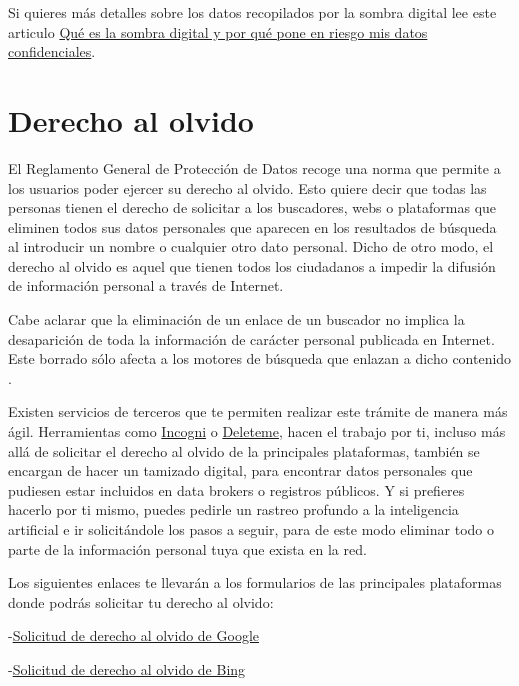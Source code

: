 \documentclass[
  spanish,
  a4paper,
  openany]{book}
\begin{document}
Si quieres más detalles sobre los datos recopilados por la sombra digital lee este articulo \href{https://www.infobae.com/tecno/2024/03/30/que-es-la-sombra-digital-y-por-que-pone-en-riesgo-mis-datos-confidenciales/}{Qué es la sombra digital y por qué pone en riesgo mis datos confidenciales}.

\section{Derecho al olvido}\label{derecho-al-olvido}

El Reglamento General de Protección de Datos recoge una norma que permite a los usuarios poder ejercer su derecho al olvido. Esto quiere decir que todas las personas tienen el derecho de solicitar a los buscadores, webs o plataformas que eliminen todos sus datos personales que aparecen en los resultados de búsqueda al introducir un nombre o cualquier otro dato personal. Dicho de otro modo, el derecho al olvido es aquel que tienen todos los ciudadanos a impedir la difusión de información personal a través de Internet.

Cabe aclarar que la eliminación de un enlace de un buscador no implica la desaparición de toda la información de carácter personal publicada en Internet. Este borrado sólo afecta a los motores de búsqueda que enlazan a dicho contenido \citep{OSI-derecho-al-olvido}.

Existen servicios de terceros que te permiten realizar este trámite de manera más ágil. Herramientas como \href{https://incogni.com/}{Incogni} o \href{https://joindeleteme.com/}{Deleteme}, hacen el trabajo por ti, incluso más allá de solicitar el derecho al olvido de la principales plataformas, también se encargan de hacer un tamizado digital, para encontrar datos personales que pudiesen estar incluidos en data brokers o registros públicos. Y si prefieres hacerlo por ti mismo, puedes pedirle un rastreo profundo a la inteligencia artificial e ir solicitándole los pasos a seguir, para de este modo eliminar todo o parte de la información personal tuya que exista en la red.

Los siguientes enlaces te llevarán a los formularios de las principales plataformas donde podrás solicitar tu derecho al olvido:

-\href{https://support.google.com/websearch/troubleshooter/3111061?hl=es}{Solicitud de derecho al olvido de Google}

-\href{https://help.bing.microsoft.com/\#apex/18/ES/10013/-1/ES}{Solicitud de derecho al olvido de Bing}
\end{document}
